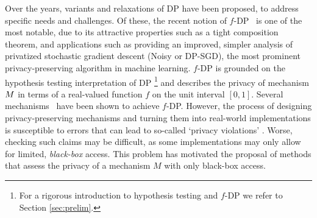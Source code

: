Over the years,  variants and relaxations of DP have been proposed, to address specific needs and challenges. Of these, the recent notion of $f$-DP~\cite{Dong2022} is one of the most notable, due to its attractive properties such as a tight composition theorem, and applications such as providing an improved, simpler analysis of privatized stochastic gradient descent (Noisy or DP-SGD), the most prominent privacy-preserving algorithm in machine learning. $f$-DP is grounded on the hypothesis testing interpretation of DP \footnote{\noindent For a rigorous introduction to hypothesis testing and $f$-DP we refer to Section \ref{sec:prelim}.} and describes the privacy of mechanism $M$ in terms of a real-valued function $f$ on the unit interval $[0,1]$. Several mechanisms~\cite{Dong2022} have been shown to achieve $f$-DP. However, the process of designing privacy-preserving mechanisms and turning them into real-world implementations is susceptible to errors that can lead to so-called `privacy violations' \cite{Lyu2017,mattjj2023fixprng,Mironov2012}. Worse, checking such claims may be difficult, as some implementations may only allow for limited, {\em black-box} access.  %
This problem has motivated the proposal of methods that assess the privacy of a mechanism $M$ with only black-box access.

